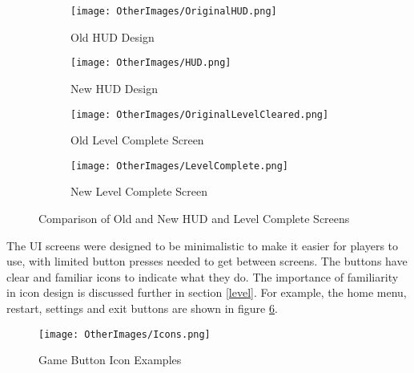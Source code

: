 \documentclass[10pt]{final_report}
\begin{document}
\begin{figure}[H]
    \centering
    \begin{subfigure}{0.45\textwidth}
        \centering
        \texttt{[image: OtherImages/OriginalHUD.png]}
        \caption{Old HUD Design}
        \label{fig:old_hud}
    \end{subfigure}
    \hfill
    \begin{subfigure}{0.45\textwidth}
        \centering
        \texttt{[image: OtherImages/HUD.png]}
        \caption{New HUD Design}
        \label{fig:new_hud}
    \end{subfigure}
    
    \vspace{1em} %

    \begin{subfigure}{0.45\textwidth}
        \centering
        \texttt{[image: OtherImages/OriginalLevelCleared.png]}
        \caption{Old Level Complete Screen}
        \label{fig:old_complete}
    \end{subfigure}
    \hfill
    \begin{subfigure}{0.45\textwidth}
        \centering
        \texttt{[image: OtherImages/LevelComplete.png]}
        \caption{New Level Complete Screen}
        \label{fig:new_complete}
    \end{subfigure}

    \caption{Comparison of Old and New HUD and Level Complete Screens}
    \label{fig:hud_comparison}
\end{figure}
The UI screens were designed to be minimalistic to make it easier for players to use, with limited button presses needed to get between screens. The buttons have clear and familiar icons to indicate what they do. The importance of familiarity in icon design is discussed further in section \ref{level}. For example, the home menu, restart, settings and exit buttons are shown in figure \ref{fig:label_icons}. 

\begin{figure}[H]
    \centering
    \texttt{[image: OtherImages/Icons.png]}
    \caption{Game Button Icon Examples}
    \label{fig:label_icons}
\end{figure}
\end{document}
